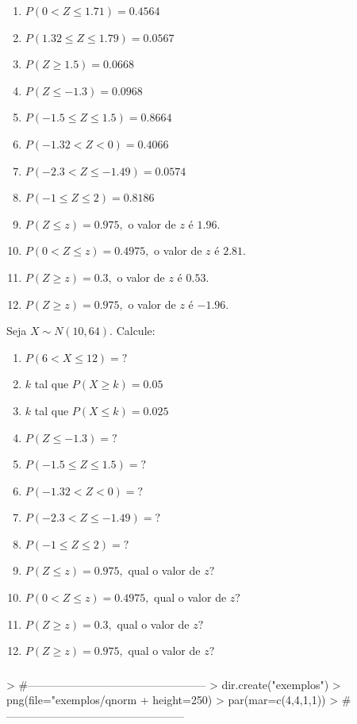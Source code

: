 \documentclass[14pt,aspectratio=1610]{beamer}
\begin{document}
\begin{frame}{}
\begin{enumerate}
\item $P(0<Z\leq 1.71)=0.4564$
\item $P(1.32\leq Z \leq 1.79)=0.0567$
\item $P(Z\geq 1.5)=0.0668$
\item $P(Z\leq -1.3)=0.0968$
\item $P(-1.5\leq Z\leq 1.5)=0.8664$
\item $P(-1.32 < Z <0)=0.4066$
\item $P(-2.3<Z\leq -1.49)=0.0574$
\item $P(-1\leq Z \leq 2)=0.8186$
\item $P(Z\leq z)=0.975,$ o valor de $z$ é $1.96.$
\item $P(0< Z \leq z)=0.4975,$ o valor de $z$ é $2.81.$
\item $P(Z\geq z)=0.3,$ o valor de $z$ é $0.53.$
\item $P(Z\geq z)=0.975,$ o valor de $z$ é $-1.96.$
\end{enumerate}
\end{frame}

\begin{frame}{}
Seja $X\sim N(10,64).$ Calcule:
\begin{enumerate}
\item $P(6<X\leq 12)=?$
\item $k$ tal que $P(X\geq k)=0.05$
\item $k$ tal que $P(X\leq k)=0.025$
\item $P(Z\leq -1.3)=?$
\item $P(-1.5\leq Z\leq 1.5)=?$
\item $P(-1.32 < Z <0)=?$
\item $P(-2.3<Z\leq -1.49)=?$
\item $P(-1\leq Z \leq 2)=?$
\item $P(Z\leq z)=0.975,$ qual o valor de $z?$
\item $P(0< Z \leq z)=0.4975,$ qual o valor de $z?$
\item $P(Z\geq z)=0.3,$ qual o valor de $z?$
\item $P(Z\geq z)=0.975,$ qual o valor de $z?$
\end{enumerate}
\end{frame}

\begin{frame}[fragile]{}
\frametitle{}
\begin{block}{}
\begin{Schunk}
\begin{Sinput}
> #------------------------------------------------
> dir.create("exemplos")
> png(file="exemplos/qnorm%
+ height=250)
> par(mar=c(4,4,1,1))
> #------------------------------------------------
\end{Sinput}
\end{Schunk}
\end{block}
\end{frame}
\end{document}
